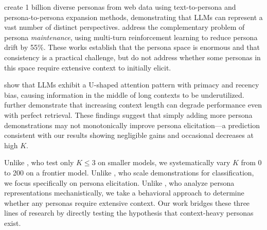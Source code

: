 \citet{tencent2024personahub} create 1 billion diverse personas from web data using text-to-persona and persona-to-persona expansion methods, demonstrating that LLMs can represent a vast number of distinct perspectives. \citet{arXiv2511consistency} address the complementary problem of persona \emph{maintenance}, using multi-turn reinforcement learning to reduce persona drift by 55\%. These works establish that the persona space is enormous and that consistency is a practical challenge, but do not address whether some personas in this space require extensive context to initially elicit.

\citet{liu2024lost} show that LLMs exhibit a U-shaped attention pattern with primacy and recency bias, causing information in the middle of long contexts to be underutilized. \citet{arXiv2510context} further demonstrate that increasing context length can degrade performance even with perfect retrieval. These findings suggest that simply adding more persona demonstrations may not monotonically improve persona elicitation---a prediction consistent with our results showing negligible gains and occasional decreases at high $K$.

Unlike \citet{choi2024picle}, who test only $K \leq 3$ on smaller models, we systematically vary $K$ from 0 to 200 on a frontier model. Unlike \citet{bertsch2024longcontext}, who scale demonstrations for classification, we focus specifically on persona elicitation. Unlike \citet{chen2025personavectors}, who analyze persona representations mechanistically, we take a behavioral approach to determine whether any personas require extensive context. Our work bridges these three lines of research by directly testing the hypothesis that context-heavy personas exist.
